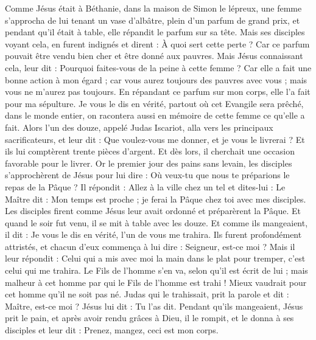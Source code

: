 \begin{multicols}{2}
Comme Jésus était à Béthanie, dans la maison de Simon le lépreux,
une femme s'approcha de lui tenant un vase d'albâtre, plein d'un parfum de grand prix, et pendant qu'il était à table, elle répandit le parfum sur sa tête.
Mais ses disciples voyant cela, en furent indignés et dirent : À quoi sert cette perte ?
Car ce parfum pouvait être vendu bien cher et être donné aux pauvres.
Mais Jésus connaissant cela, leur dit : Pourquoi faites-vous de la peine à cette femme ? Car elle a fait une bonne action à mon égard ;
car vous aurez toujours des pauvres avec vous ; mais vous ne m'aurez pas toujours.
En répandant ce parfum sur mon corps, elle l'a fait pour ma sépulture.
Je vous le dis en vérité, partout où cet Evangile sera prêché, dans le monde entier, on racontera aussi en mémoire de cette femme ce qu'elle a fait.
Alors l'un des douze, appelé Judas Iscariot, alla vers les principaux sacrificateurs,
et leur dit : Que voulez-vous me donner, et je vous le livrerai ? Et ils lui comptèrent trente pièces d'argent.
Et dès lors, il cherchait une occasion favorable pour le livrer.
Or le premier jour des pains sans levain, les disciples s'approchèrent de Jésus pour lui dire : Où veux-tu que nous te préparions le repas de la Pâque ?
Il répondit : Allez à la ville chez un tel et dites-lui : Le Maître dit : Mon temps est proche ; je ferai la Pâque chez toi avec mes disciples.
Les disciples firent comme Jésus leur avait ordonné et préparèrent la Pâque.
Et quand le soir fut venu, il se mit à table avec les douze.
Et comme ils mangeaient, il dit : Je vous le dis en vérité, l'un de vous me trahira.
Ils furent profondément attristés, et chacun d'eux commença à lui dire : Seigneur, est-ce moi ?
Mais il leur répondit : Celui qui a mis avec moi la main dans le plat pour tremper, c'est celui qui me trahira.
Le Fils de l'homme s'en va, selon qu'il est écrit de lui ; mais malheur à cet homme par qui le Fils de l'homme est trahi ! Mieux vaudrait pour cet homme qu'il ne soit pas né.
Judas qui le trahissait, prit la parole et dit : Maître, est-ce moi ? Jésus lui dit : Tu l'as dit.
Pendant qu'ils mangeaient, Jésus prit le pain, et après avoir rendu grâces à Dieu, il le rompit, et le donna à ses disciples et leur dit : Prenez, mangez, ceci est mon corps.

\end{multicols}
